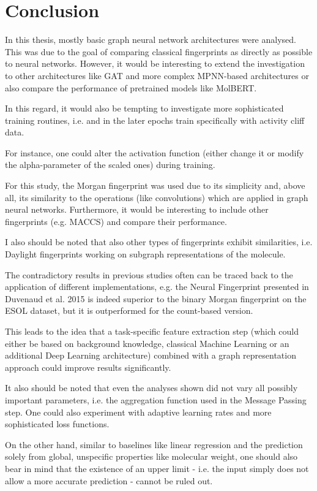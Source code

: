 \chapter{Conclusion}

In this thesis, mostly basic graph neural network architectures were analysed. This was due to the goal of comparing classical fingerprints as directly as possible to neural networks.
However, it would be interesting to extend the investigation to other architectures like GAT and more complex MPNN-based architectures or also compare the performance of pretrained models like MolBERT.

In this regard, it would also be tempting to investigate more sophisticated training routines, i.e. 
and in the later epochs train specifically with activity cliff data.

For instance, one could alter the activation function (either change it or modify the alpha-parameter of the scaled ones) during training.

For this study, the Morgan fingerprint was used due to its simplicity and, above all, its similarity to the operations (like convolutions) which are applied in graph neural networks.
Furthermore, it would be interesting to include other fingerprints (e.g. MACCS) and compare their performance. 

I also should be noted that also other types of fingerprints exhibit similarities, i.e. Daylight fingerprints working on subgraph representations of the molecule.

The contradictory results in previous studies often can be traced back to the application of different implementations, e.g. the Neural Fingerprint presented in Duvenaud et al. 2015 is indeed superior to the binary Morgan fingerprint on the ESOL dataset, but it is outperformed for the count-based version. 

This leads to the idea that a task-specific feature extraction step (which could either be based on background knowledge, classical Machine Learning or an additional Deep Learning architecture) combined with a graph representation approach could improve results significantly.

It also should be noted that even the analyses shown did not vary all possibly important parameters, i.e. the aggregation function used in the Message Passing step. One could also experiment with adaptive learning rates and more sophisticated loss functions.

On the other hand, similar to baselines like linear regression and the prediction solely from global, unspecific properties like molecular weight, one should also bear in mind that the existence of an upper limit - i.e. the input simply does not allow a more accurate prediction - cannot be ruled out.

